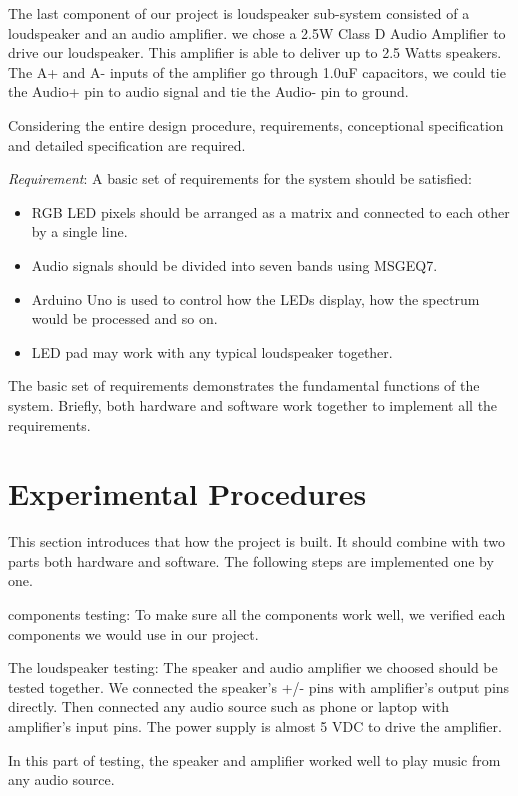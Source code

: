 \documentclass[12pt,a4paper,journal]{IEEEtran}
\begin{document}
The last component of our project is loudspeaker sub-system consisted of a loudspeaker and an audio amplifier. we chose a 2.5W Class D Audio Amplifier to drive our loudspeaker. This amplifier is able to deliver up to 2.5 Watts speakers. The A+ and A- inputs of the amplifier go through 1.0uF capacitors, we could tie the Audio+ pin to audio signal and tie the Audio- pin to ground.

Considering the entire design procedure, requirements, conceptional specification and detailed specification are required.

\emph{Requirement}: A basic set of requirements for the system should be satisfied: 

\begin{itemize}
\item RGB LED pixels should be arranged as a matrix and connected to each other by a single line.
\item Audio signals should be divided into seven bands using MSGEQ7.
\item Arduino Uno is used to control how the LEDs display, how the spectrum would be processed and so on.
\item LED pad may work with any typical loudspeaker together.
\end{itemize}

The basic set of requirements demonstrates the fundamental functions of the system. Briefly, both hardware and software work together to implement all the requirements.

\section{Experimental Procedures}

This section introduces that how the project is built. It should combine with two parts both hardware and software. The following steps are implemented one by one.

components testing: To make sure all the components work well, we  verified each components we would use in our project.

The loudspeaker testing: The speaker and audio amplifier we choosed should be tested together. We connected the speaker's +/- pins with amplifier's output pins directly. Then connected any audio source such as phone or laptop with amplifier's input pins. The power supply is almost 5 VDC to drive the amplifier.

In this part of testing, the speaker and amplifier worked well to play music from any audio source.
\end{document}
